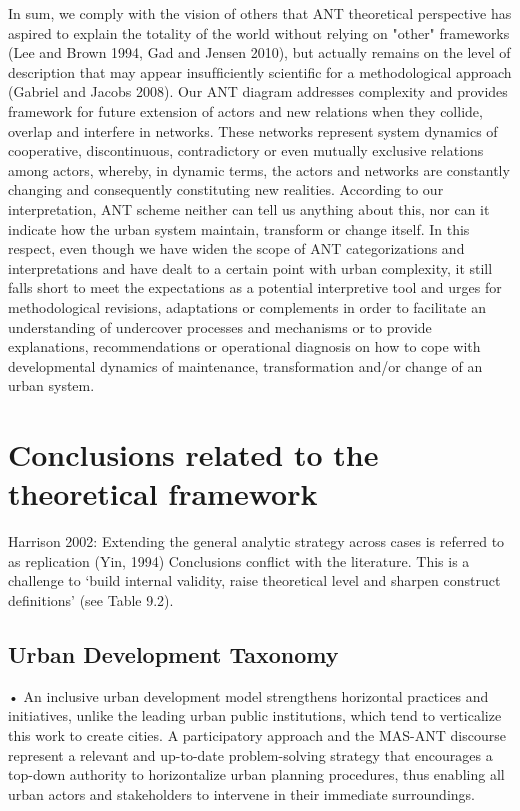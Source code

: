 \documentclass[11pt]{report}
\begin{document}
In sum, we comply with the vision of others that ANT theoretical perspective has aspired to explain the totality of the world without relying on "other" frameworks (Lee and Brown 1994, Gad and Jensen 2010), but actually remains on the level of description that may appear insufﬁciently scientiﬁc for a methodological approach (Gabriel and Jacobs 2008). Our ANT diagram addresses complexity and provides framework for future extension of actors and new relations when they collide, overlap and interfere in networks. These networks represent system dynamics of cooperative, discontinuous, contradictory or even mutually exclusive relations among actors, whereby, in dynamic terms, the actors and networks are constantly changing and consequently constituting new realities. According to our interpretation, ANT scheme neither can tell us anything about this, nor can it indicate how the urban system maintain, transform or change itself. In this respect, even though we have widen the scope of ANT categorizations and interpretations and have dealt to a certain point with urban complexity, it still falls short to meet the expectations as a potential interpretive tool and urges for methodological revisions, adaptations or complements in order to facilitate an understanding of undercover processes and mechanisms or to provide explanations, recommendations or operational diagnosis on how to cope with developmental dynamics of maintenance, transformation and/or change of an urban system.


\section{Conclusions related to the theoretical framework}

Harrison 2002:
Extending the general analytic strategy across cases is referred to as replication (Yin, 1994)
Conclusions conflict with the literature. This is a challenge to
‘build internal validity, raise theoretical level and sharpen construct definitions’ (see Table 9.2).

\subsection{Urban Development Taxonomy}

•	An inclusive urban development model strengthens horizontal practices and initiatives, unlike the leading urban public institutions, which tend to verticalize this work to create cities. A participatory approach and the MAS-ANT discourse represent a relevant and up-to-date problem-solving strategy that encourages a top-down authority to horizontalize urban planning procedures, thus enabling all urban actors and stakeholders to intervene in their immediate surroundings. 
\end{document}
